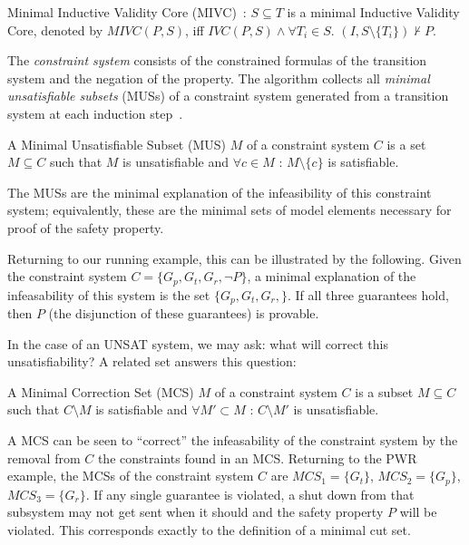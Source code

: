 \begin{definition}
Minimal Inductive Validity Core (MIVC)~\cite{Ghassabani2017EfficientGO}: $S \subseteq T$ is a minimal Inductive Validity Core, denoted by $\mathit{MIVC(P,S)}$, iff $\mathit{IVC(P,S)} \land \forall T_i \in S$. $(I, S \setminus \{T_i\}) \not \vdash P$.
\end{definition}

The {\em constraint system} consists of the constrained formulas of the transition system and the negation of the property. The \aivcalg algorithm collects all {\em minimal unsatisfiable subsets} (MUSs) of a constraint system generated from a transition system at each induction step~\cite{Ghassabani2017EfficientGO,bendik2018online}. 

\begin{definition}
A Minimal Unsatisfiable Subset (MUS) $M$ of a constraint system $C$ is a set $M \subseteq C$ such that $M$ is unsatisfiable and $\forall c \in M$ : $M \setminus \{c\}$ is satisfiable.
\end{definition}
The MUSs are the minimal explanation of the infeasibility of this constraint system; equivalently, these are the minimal sets of model elements necessary for proof of the safety property.

Returning to our running example, this can be illustrated by the following. Given the constraint system $C = \{G_p, G_t, G_r, \neg P\}$, a minimal explanation of the infeasability of this system is the set $\{G_p, G_t, G_r,\}$. If all three guarantees hold, then $P$ (the disjunction of these guarantees) is provable. 

In the case of an UNSAT system, we may ask: what will correct this unsatisfiability? A related set answers this question: 
\begin{definition}
A Minimal Correction Set (MCS) $M$ of a constraint system $C$ is a subset $M\subseteq C$ such that $C \setminus M$ is satisfiable and $\forall M' \subset M$ : $C \setminus M'$ is unsatisfiable.
\end{definition}
A MCS can be seen to ``correct'' the infeasability of the constraint system by the removal from $C$ the constraints found in an MCS. Returning to the PWR example, the MCSs of the constraint system $C$ are $\mathit{MCS}_1 = \{G_t\}$, $\mathit{MCS}_2 = \{G_p\}$, $\mathit{MCS}_3 = \{G_r\}$. If any single guarantee is violated, a shut down from that subsystem may not get sent when it should and the safety property $P$ will be violated. This corresponds exactly to the definition of a minimal cut set.

